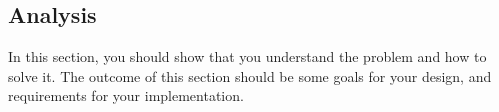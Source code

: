 \subsection{Analysis}

\label{sec:analysis}

In this section, you should show that you understand the problem and how to
solve it. The outcome of this section should be some goals for your design, and
requirements for your implementation.
